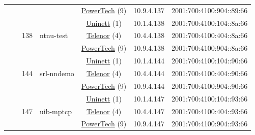 \begin{small}
\begin{center}
\begin{longtable}{|c|c|c|c|c|c|c|c|}
  &  &  &  & \multicolumn{2}{|c|}{\tiny{\href{http://www.powertech.no}{PowerTech} (9)}} & \tiny{10.9.4.137} & \tiny{2001:700:4100:904::89:66} \\* \cline{3-3}\cline{4-4}\cline{5-5}\cline{6-6}\cline{7-7}\cline{8-8}
  &  & \multirow{3}{*}{\tiny{138}} & \multicolumn{1}{|l|}{\multirow{3}{*}{\tiny{ntnu-test}}} & \multicolumn{2}{|c|}{\tiny{\href{https://www.uninett.no}{Uninett} (1)}} & \tiny{10.1.4.138} & \tiny{2001:700:4100:104::8a:66} \\* \cline{5-5}\cline{6-6}\cline{7-7}\cline{8-8}
  &  &  &  & \multicolumn{2}{|c|}{\tiny{\href{https://www.telenor.no}{Telenor} (4)}} & \tiny{10.4.4.138} & \tiny{2001:700:4100:404::8a:66} \\* \cline{5-5}\cline{6-6}\cline{7-7}\cline{8-8}
  &  &  &  & \multicolumn{2}{|c|}{\tiny{\href{http://www.powertech.no}{PowerTech} (9)}} & \tiny{10.9.4.138} & \tiny{2001:700:4100:904::8a:66} \\* \cline{3-3}\cline{4-4}\cline{5-5}\cline{6-6}\cline{7-7}\cline{8-8}
  &  & \multirow{3}{*}{\tiny{144}} & \multicolumn{1}{|l|}{\multirow{3}{*}{\tiny{srl-nndemo}}} & \multicolumn{2}{|c|}{\tiny{\href{https://www.uninett.no}{Uninett} (1)}} & \tiny{10.1.4.144} & \tiny{2001:700:4100:104::90:66} \\* \cline{5-5}\cline{6-6}\cline{7-7}\cline{8-8}
  &  &  &  & \multicolumn{2}{|c|}{\tiny{\href{https://www.telenor.no}{Telenor} (4)}} & \tiny{10.4.4.144} & \tiny{2001:700:4100:404::90:66} \\* \cline{5-5}\cline{6-6}\cline{7-7}\cline{8-8}
  &  &  &  & \multicolumn{2}{|c|}{\tiny{\href{http://www.powertech.no}{PowerTech} (9)}} & \tiny{10.9.4.144} & \tiny{2001:700:4100:904::90:66} \\* \cline{3-3}\cline{4-4}\cline{5-5}\cline{6-6}\cline{7-7}\cline{8-8}
  &  & \multirow{3}{*}{\tiny{147}} & \multicolumn{1}{|l|}{\multirow{3}{*}{\tiny{uib-mptcp}}} & \multicolumn{2}{|c|}{\tiny{\href{https://www.uninett.no}{Uninett} (1)}} & \tiny{10.1.4.147} & \tiny{2001:700:4100:104::93:66} \\* \cline{5-5}\cline{6-6}\cline{7-7}\cline{8-8}
  &  &  &  & \multicolumn{2}{|c|}{\tiny{\href{https://www.telenor.no}{Telenor} (4)}} & \tiny{10.4.4.147} & \tiny{2001:700:4100:404::93:66} \\* \cline{5-5}\cline{6-6}\cline{7-7}\cline{8-8}
  &  &  &  & \multicolumn{2}{|c|}{\tiny{\href{http://www.powertech.no}{PowerTech} (9)}} & \tiny{10.9.4.147} & \tiny{2001:700:4100:904::93:66} \\* \cline{3-3}\cline{4-4}\cline{5-5}\cline{6-6}\cline{7-7}\cline{8-8}

\end{longtable}
\end{center}
\end{small}
